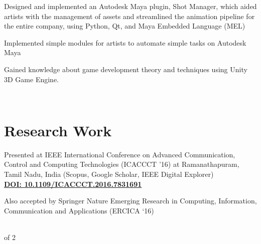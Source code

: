 \documentclass[]{deedy-resume-openfont}
\begin{document}
\begin{minipage}[t]{0.65\textwidth}
\vspace{0.1cm}
\begin{tightemize}
\item \normalsize Designed and implemented an Autodesk Maya plugin, Shot Manager, which aided artists with the management of assets and streamlined the animation pipeline for the entire company, using Python, Qt, and Maya Embedded Language (MEL)
\item \normalsize Implemented simple modules for artists to automate simple tasks on Autodesk Maya
\item \normalsize Gained knowledge about game development theory and techniques using Unity 3D Game Engine.
\end{tightemize}
\sectionsep

\hfill \\
\section{Research Work}
\vspace{0.1cm}
\begin{tightemize}
\item \normalsize Presented at IEEE International Conference on Advanced Communication, Control and Computing Technologies (ICACCCT ’16) at Ramanathapuram, Tamil Nadu, India (Scopus, Google Scholar, IEEE Digital Explorer)\\ \textbf{\href{http://ieeexplore.ieee.org/document/7831691/}{DOI: 10.1109/ICACCCT.2016.7831691}}\\ 
\item \normalsize Also accepted by Springer Nature Emerging Research in Computing, Information, Communication and Applications (ERCICA ‘16)
\end{tightemize}
\sectionsep
\end{minipage}
\hfill \\
\vspace{0.1cm}
\footnotesize {} of 2
\end{document}
